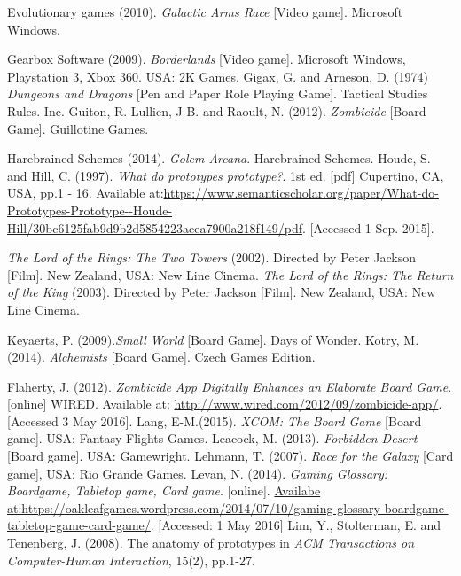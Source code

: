 \documentclass[a4paper,11pt]{article}
\begin{document}
\begin{thebibliography}{1}
Evolutionary games (2010). \textit{Galactic Arms Race} [Video game]. Microsoft Windows. 


Gearbox Software (2009). \textit{Borderlands} [Video game]. Microsoft Windows, Playstation 3, Xbox 360. USA: 2K Games.
Gigax, G. and Arneson, D. (1974) \textit{Dungeons and Dragons} [Pen and Paper Role Playing Game]. Tactical Studies Rules. Inc.
Guiton, R. Lullien, J-B. and Raoult, N. (2012). \textit{Zombicide} [Board Game]. Guillotine Games.

Harebrained Schemes (2014). \textit{Golem Arcana}. Harebrained Schemes.
Houde, S. and Hill, C. (1997). \textit{What do prototypes prototype?}. 1st ed. [pdf] Cupertino, CA, USA, pp.1 - 16. Available at:\url{https://www.semanticscholar.org/paper/What-do-Prototypes-Prototype--Houde-Hill/30bc6125fab9d9b2d5854223aeea7900a218f149/pdf}. [Accessed 1 Sep. 2015].

\textit{The Lord of the Rings: The Two Towers} (2002). Directed by Peter Jackson [Film]. New Zealand, USA: New Line Cinema.
\textit{The Lord of the Rings: The Return of the King} (2003). Directed by Peter Jackson [Film]. New Zealand, USA: New Line Cinema.


Keyaerts, P. (2009).\textit{Small World} [Board Game]. Days of Wonder.
Kotry, M. (2014). \textit{Alchemists} [Board Game]. Czech Games Edition.

Flaherty, J. (2012). \textit{Zombicide App Digitally Enhances an Elaborate Board Game}. [online] WIRED. Available at: \url{http://www.wired.com/2012/09/zombicide-app/}. [Accessed 3 May 2016].
Lang, E-M.(2015). \textit{XCOM: The Board Game} [Board game]. USA: Fantasy Flights Games.
Leacock, M. (2013). \textit{Forbidden Desert} [Board game]. USA: Gamewright.
Lehmann, T. (2007). \textit{Race for the Galaxy} [Card game], USA: Rio Grande Games.
Levan, N. (2014). \textit{Gaming Glossary: Boardgame, Tabletop game, Card game}. [online]. \url{Availabe at:https://oakleafgames.wordpress.com/2014/07/10/gaming-glossary-boardgame-tabletop-game-card-game/}. [Accessed: 1 May 2016]
Lim, Y., Stolterman, E. and Tenenberg, J. (2008). The anatomy of prototypes in \textit{ACM Transactions on Computer-Human Interaction}, 15(2), pp.1-27.


\end{thebibliography}
\end{document}
